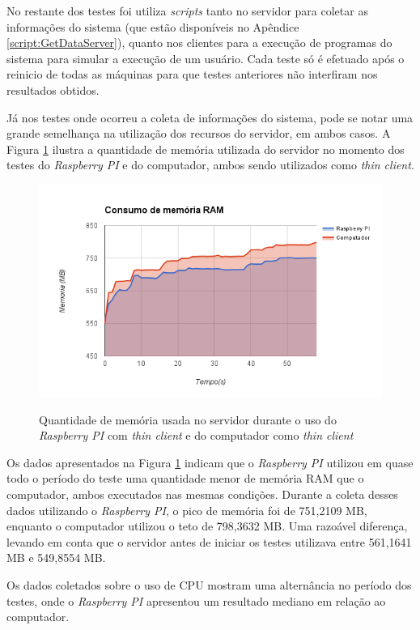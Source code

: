 \documentclass[
	12pt,				%
	openright,			%
	twoside,			%
	a4paper,			%
	chapter=TITLE,		%
	english,			%
	brazil				%
	]{abntex2}
\begin{document}
No restante dos testes foi utiliza \textit{scripts} tanto no servidor para coletar as informações do sistema (que estão disponíveis no Apêndice \ref{script:GetDataServer}), quanto nos clientes para a execução de programas do sistema para simular a execução de um usuário. Cada teste só é efetuado após o reinicio de todas as máquinas para que testes anteriores não interfiram nos resultados obtidos.

Já nos testes onde ocorreu a coleta de informações do sistema, pode se notar uma grande semelhança na utilização dos recursos do servidor, em ambos casos. A Figura \ref{fig:memoria} ilustra a quantidade de memória utilizada do servidor no momento dos testes do \textit{Raspberry PI} e do computador, ambos sendo utilizados como \textit{thin client}.

\begin{figure}[!htb]
\centering
\caption{Quantidade de memória usada no servidor durante o uso do \textit{Raspberry PI} com \textit{thin client} e do computador como \textit{thin client}}
\includegraphics[scale=0.8]{Imagens/memoria}
\label{fig:memoria}
\end{figure}


Os dados apresentados na Figura \ref{fig:memoria} indicam que o \textit{Raspberry PI} utilizou em quase todo o período do teste uma quantidade menor de memória RAM que o computador, ambos executados nas mesmas condições. Durante a coleta desses dados utilizando o \textit{Raspberry PI}, o pico de memória foi de 751,2109 MB, enquanto o computador utilizou o teto de 798,3632 MB. Uma razoável diferença, levando em conta que o servidor antes de iniciar os testes utilizava entre 561,1641 MB e 549,8554 MB. 

Os dados coletados sobre o  uso de CPU mostram uma alternância no período dos testes, onde o \textit{Raspberry PI} apresentou um resultado mediano em relação ao computador.
\end{document}
